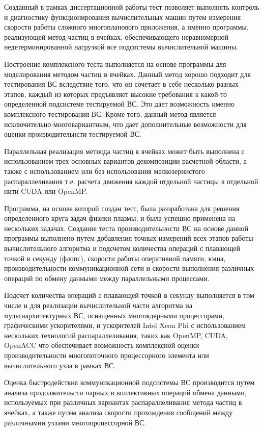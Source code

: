Созданный в рамках диссертационной работы тест позволяет выполнять контроль и диагностику функционирования вычислительных машин путем измерения скорости работы сложного многопланового приложения, а именно программы, реализующей метод частиц в ячейках, обеспечивающего неравномерной недетерминированной нагрузкой все подсистемы вычислительной машины.

{\methods} Построение комплексного теста выполняется на основе программы для моделирования методом частиц в ячейках. Данный метод хорошо подходит для тестирования ВС вследствие того, что он сочетает в себе несколько разных этапов, каждый из которых предъявляет высокие требования к какой-то определенной подсистеме тестируемой ВС. Это дает возможность именно комплексного тестирования ВС. Кроме того, данный метод является исключительно многовариантным, что дает дополнительные возможности  для оценки производительнсти тестируемой ВС.

Параллельная реализация метиода частиц в ячейках может быть выполнена с использованием трех основных вариантов декомпозиции расчетной области, а также с использованием или без использования мелкозернистого распараллеливания т.е. расчета движения каждой отдельной частицы в отдельной нити CUDA или OpenMP. 

Программа, на основе которой создан тест, была раззработана для решения определенного круга задач физики плазмы, и была успешно применена на нескольких задачах. Создание теста производительности ВС на основе данной программы выполнено путем добавления точных измерений всех этапов работы вычислительного алгоритма и подсчетом количества операций с плавающей точкой в секунду (флопс), скорости работы оперативной памяти, кэша, производительности коммуникационной сети и скорости выполнения различных операций по обмену данными между параллельными процессами.

Подсчет количества операций с плавающей точкой в секунду выполняется в том числе и  для реализации вычислительной части алгоритма на мультиархитектурных ВС, оснащенных многоядерными процессорами, графическими ускорителями, и ускорителей Intel Xeon Phi с использованием нескольких технологий распараллеливания, таких как OpenMP, CUDA, OpenACC что обеспечивает возможность комплексной оценки производительности многопоточного процессорного элемента или вычислительного узла в рамках ВС.

Оценка быстродействия коммуникационной подсистемы ВС производится путем анализа продолжительсти парных и коллективных операций обмена данными, используемых при различных вариантах распараллеливания метода частиц в ячейках, а также путем анализа скорости прохождения сообщений между различнымии узлами многопроцессорной ВС.    


